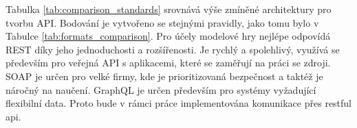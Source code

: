Tabulka \ref{tab:comparison_standards} srovnává výše zmíněné architektury pro tvorbu API. Bodování je vytvořeno se stejnými pravidly, jako tomu bylo v Tabulce \ref{tab:formats_comparison}. Pro účely modelové hry nejlépe odpovídá REST díky jeho jednoduchosti a rozšířenosti. Je rychlý a spolehlivý, využívá se především pro veřejná API s aplikacemi, které se zaměřují na práci se zdroji. SOAP je určen pro velké firmy, kde je prioritizovaná bezpečnost a taktéž je náročný na naučení. GraphQL je určen především pro systémy vyžadující flexibilní data. Proto bude v rámci práce implementována komunikace přes \gls{restful api}\@.

\endinput